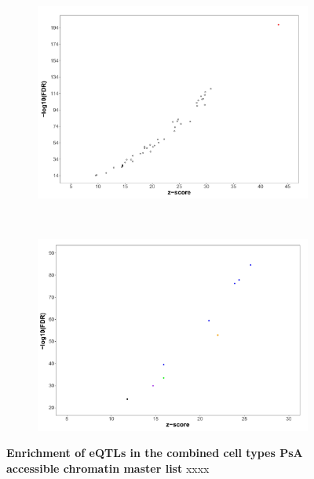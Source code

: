 

\bigskip
\begin{figure}[H]
\centering
\begin{subfigure}[b]{0.7\textwidth}
\centering 
\includegraphics[width=\textwidth]{./Results3/pdfs/ATAC_PSA_all_GTeX_eQTL_enrichment_dotplot}
\caption{}
\end{subfigure}
~
\begin{subfigure}[b]{0.7\textwidth} 
\centering
\includegraphics[width=\textwidth]{./Results3/pdfs/ATAC_PSA_all_Jknight_eQTL_enrichment_dotplot}
\caption{}
\end{subfigure}
\caption[Enrichment of eQTLs in the combined cell types PsA accessible chromatin master list.]{\textbf{Enrichment of eQTLs in the combined cell types PsA accessible chromatin master list} xxxx}
\label{figure:PsA_FAST_ATAC_eQTL_enrichment}
\end{figure}





